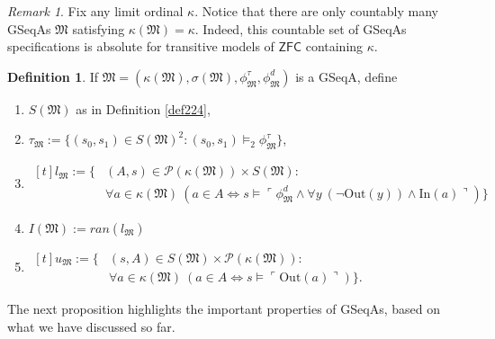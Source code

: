 \documentclass[12pt, twoside]{memoir}
\numberwithin{equation}{section}
\theoremstyle{definition}
\newtheorem{defi}[thm]{Definition}
\theoremstyle{remark}
\newtheorem{rem}[thm]{Remark}
\theoremstyle{definition}
\theoremstyle{definition}
\theoremstyle{definition}
\theoremstyle{remark}
\begin{document}
\begin{rem}\label{rem225}
Fix any limit ordinal $\kappa$. Notice that there are only countably many GSeqAs $\mathfrak{M}$ satisfying $\kappa(\mathfrak{M}) = \kappa$. Indeed, this countable set of GSeqAs specifications is absolute for transitive models of $\mathsf{ZFC}$ containing $\kappa$.
\end{rem}

\begin{defi}
If $\mathfrak{M} = (\kappa(\mathfrak{M}), \sigma(\mathfrak{M}), \phi^{\tau}_{\mathfrak{M}}, \phi^d_{\mathfrak{M}})$ is a GSeqA, define 
\begin{enumerate}[label=(\arabic*)]
    \item $S(\mathfrak{M})$ as in Definition \ref{def224},
    \item $\tau_{\mathfrak{M}} := \{(s_0, s_1) \in S(\mathfrak{M})^2 : (s_0, s_1) \models_2 \phi^{\tau}_{\mathfrak{M}}\}$,
    \item 
    \!
    $\begin{aligned}[t]
       l_{\mathfrak{M}} := \{ & (A, s) \in \mathcal{P}(\kappa(\mathfrak{M})) \times S(\mathfrak{M}) : \\
       & \forall a \in \kappa(\mathfrak{M}) \ (a \in A \iff s \models \ulcorner \phi^d_{\mathfrak{M}} \wedge \forall y \ (\neg \mathrm{Out}(y)) \wedge \mathrm{In}(a) \urcorner)\} 
    \end{aligned}$
    \item $I(\mathfrak{M}) := ran(l_{\mathfrak{M}})$
    \item 
    \!
    $\begin{aligned}[t]
        u_{\mathfrak{M}} := \{ & (s, A) \in S(\mathfrak{M}) \times \mathcal{P}(\kappa(\mathfrak{M})) : \\
        & \forall a \in \kappa(\mathfrak{M}) \ (a \in A \iff s \models \ulcorner \mathrm{Out}(a) \urcorner)\} \text{.}
    \end{aligned}$
\end{enumerate}
\end{defi}

The next proposition highlights the important properties of GSeqAs, based on what we have discussed so far.
\end{document}
